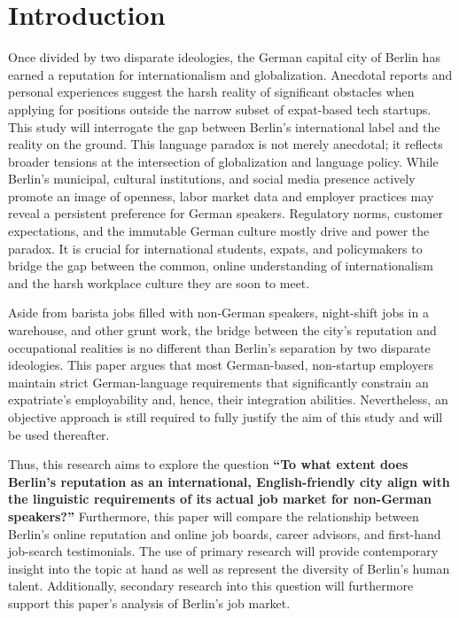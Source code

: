 \chapter{Introduction}
\noindent
Once divided by two disparate ideologies, the German capital city of Berlin has earned a reputation for internationalism and globalization. Anecdotal reports and personal experiences suggest the harsh reality of significant obstacles when applying for positions outside the narrow subset of expat-based tech startups. This study will interrogate the gap between Berlin’s international label and the reality on the ground.
This language paradox is not merely anecdotal; it reflects broader tensions at the intersection of globalization and language policy. While Berlin’s municipal, cultural institutions, and social media presence actively promote an image of openness, labor market data and employer practices may reveal a persistent preference for German speakers. Regulatory norms, customer expectations, and the immutable German culture mostly drive and power the paradox. It is crucial for international students, expats, and policymakers to bridge the gap between the common, online understanding of internationalism and the harsh workplace culture they are soon to meet.\par
Aside from barista jobs filled with non-German speakers, night-shift jobs in a warehouse, and other grunt work, the bridge between the city’s reputation and occupational realities is no different than Berlin’s separation by two disparate ideologies. This paper argues that most German-based, non-startup employers maintain strict German-language requirements that significantly constrain an expatriate’s employability and, hence, their integration abilities. Nevertheless, an objective approach is still required to fully justify the aim of this study and will be used thereafter.\par
Thus, this research aims to explore the question \textbf{“To what extent does Berlin’s reputation as an international, English-friendly city align with the linguistic requirements of its actual job market for non-German speakers?”} Furthermore, this paper will compare the relationship between Berlin’s online reputation and online job boards, career advisors, and first-hand job-search testimonials. The use of primary research will provide contemporary insight into the topic at hand as well as represent the diversity of Berlin’s human talent. Additionally, secondary research into this question will furthermore support this paper’s analysis of Berlin’s job market.



